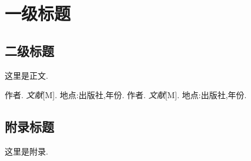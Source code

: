 \documentclass[12pt,a4paper,oneside]{ctexart}
\begin{document}
	\section{一级标题}
	
	\subsection{二级标题}
	
	
	这里是正文. 
	
	\newpage
	
	\begin{thebibliography}{99}
		作者. \emph{文献}[M]. 地点:出版社,年份.
		作者. \emph{文献}[M]. 地点:出版社,年份.
	\end{thebibliography}
	
	\newpage
	
	\begin{appendices}
		\renewcommand{\thesection}{\Alph{section}}
		\section{附录标题}
		这里是附录. 
	\end{appendices}
	
\end{document}
